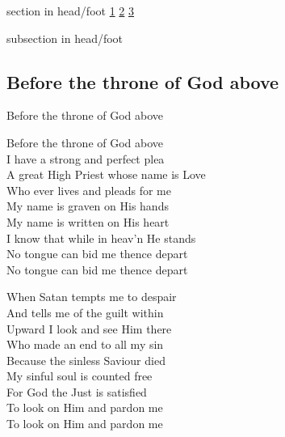 \documentclass{beamer}
\begin{document}
{
{ 
 {
 \begin{beamercolorbox}[ht=4.5ex,dp=1.5ex,%
      leftskip=.3cm,rightskip=.3cm plus1fil]{section in head/foot}
 \fontsize{12}{25}\selectfont 
\hyperlink{Before the throne of God above[]1}{1}
\hyperlink{Before the throne of God above[]2}{2}
\hyperlink{Before the throne of God above[]3}{3}
 
 \end{beamercolorbox}%
  \begin{beamercolorbox}[ht=2.5ex,dp=1.125ex,%
   leftskip=.3cm,rightskip=.3cm plus1fil]{subsection in head/foot}
   \insertauthor
 \end{beamercolorbox}%
 }
}
\subsection{ Before the throne of God above }

\hypertarget{Before the throne of God above[]1}{}
\begin{frame}{Before the throne of God above }
\fontsize{ 15 }{ 19 }\selectfont

Before the throne of God above\\ 
I have a strong and perfect plea\\ 
A great High Priest whose name is Love\\ 
Who ever lives and pleads for me\\ 
My name is graven on His hands\\ 
My name is written on His heart\\ 
I know that while in heav'n He stands\\ 
No tongue can bid me thence depart\\ 
No tongue can bid me thence depart 

\end{frame}

\hypertarget{Before the throne of God above[]2}{}
\begin{frame}{}
\fontsize{ 15 }{ 19 }\selectfont

When Satan tempts me to despair\\ 
And tells me of the guilt within\\ 
Upward I look and see Him there\\ 
Who made an end to all my sin\\ 
Because the sinless Saviour died\\ 
My sinful soul is counted free\\ 
For God the Just is satisfied\\ 
To look on Him and pardon me\\ 
To look on Him and pardon me 


\end{frame}}
\end{document}
